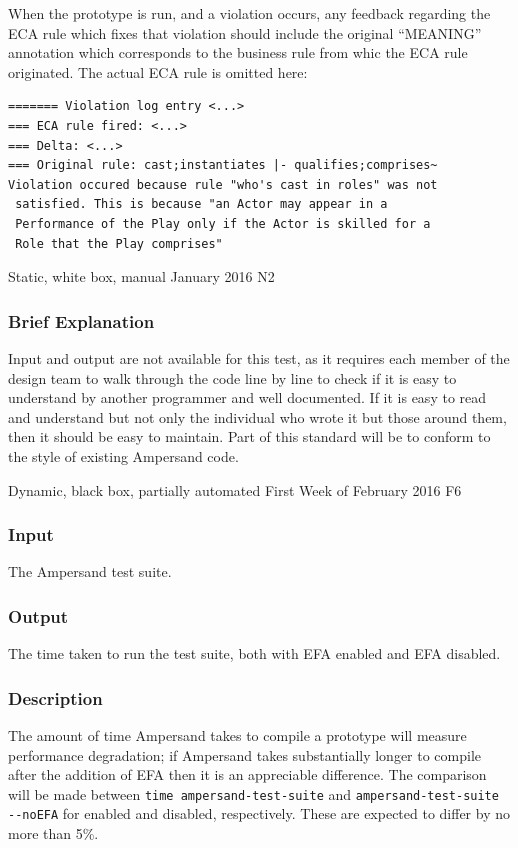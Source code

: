 \documentclass[12pt]{report}
\begin{document}
When the prototype is run, and a violation occurs, any feedback regarding the
ECA rule which fixes that violation should include the original ``MEANING''
annotation which corresponds to the business rule from whic the ECA rule originated.
The actual ECA rule is omitted here:

\begin{verbatim}
======= Violation log entry <...>
=== ECA rule fired: <...> 
=== Delta: <...>
=== Original rule: cast;instantiates |- qualifies;comprises~
Violation occured because rule "who's cast in roles" was not 
 satisfied. This is because "an Actor may appear in a 
 Performance of the Play only if the Actor is skilled for a 
 Role that the Play comprises"
\end{verbatim}


{Static, white box, manual}
{January 2016}
{N2}
\vspace{-12pt}\subsubsection*{Brief Explanation}
Input and output are not available for this test, as it requires each member of
the design team to walk through the code line by line to check if it is easy to
understand by another programmer and well documented. If it is easy to read and
understand but not only the individual who wrote it but those around them, then
it should be easy to maintain. Part of this standard will be to conform to the
style of existing Ampersand code.

{Dynamic, black box, partially automated}
{First Week of February 2016 }
{F6}
\vspace{-12pt}\subsubsection*{Input}
The Ampersand test suite. 

\vspace{-12pt}\subsubsection*{Output}
The time taken to run the test suite, both with EFA enabled and EFA disabled.

\vspace{-12pt}\subsubsection*{Description}
The amount of time Ampersand takes to compile a prototype will measure
performance degradation; if Ampersand takes substantially longer to compile
after the addition of EFA then it is an appreciable difference.  The comparison
will be made between \verb|time ampersand-test-suite| and
\verb|ampersand-test-suite --noEFA| for enabled and disabled,
respectively. These are expected to differ by no more than 5\%. 
\end{document}
